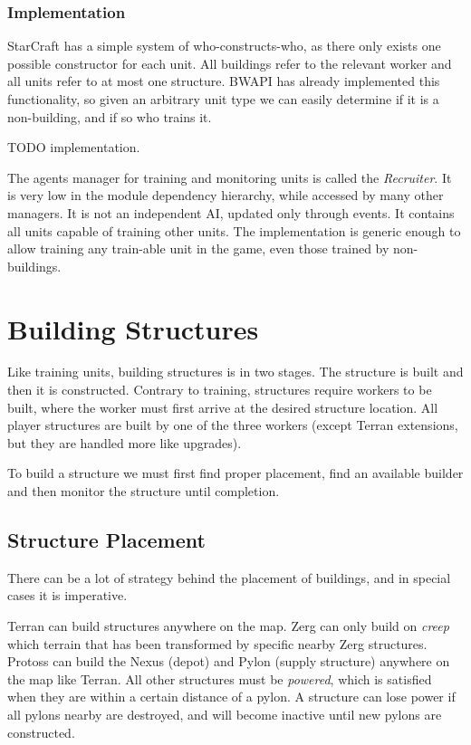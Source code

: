 		\subsubsection*{Implementation}
		StarCraft has a simple system of who-constructs-who, as there only exists one possible constructor for each unit. All buildings refer to the relevant worker and all units refer to at most one structure. BWAPI has already implemented this functionality, so given an arbitrary unit type we can easily determine if it is a non-building, and if so who trains it.
		
		TODO implementation.
		
		The agents manager for training and monitoring units is called the \emph{Recruiter}. It is very low in the module dependency hierarchy, while accessed by many other managers. It is not an independent AI, updated only through events. It contains all units capable of training other units. The implementation is generic enough to allow training any train-able unit in the game, even those trained by non-buildings.

\section{Building Structures}
Like training units, building structures is in two stages. The structure is built and then it is constructed. Contrary to training, structures require workers to be built, where the worker must first arrive at the desired structure location. All player structures are built by one of the three workers (except Terran extensions, but they are handled more like upgrades).

To build a structure we must first find proper placement, find an available builder and then monitor the structure until completion.

	\subsection*{Structure Placement}
	There can be a lot of strategy behind the placement of buildings, and in special cases it is imperative.
	
	Terran can build structures anywhere on the map. Zerg can only build on \emph{creep} which terrain that has been transformed by specific nearby Zerg structures. Protoss can build the Nexus (depot) and Pylon (supply structure) anywhere on the map like Terran. All other structures must be \emph{powered}, which is satisfied when they are within a certain distance of a pylon. A structure can lose power if all pylons nearby are destroyed, and will become inactive until new pylons are constructed.
	
